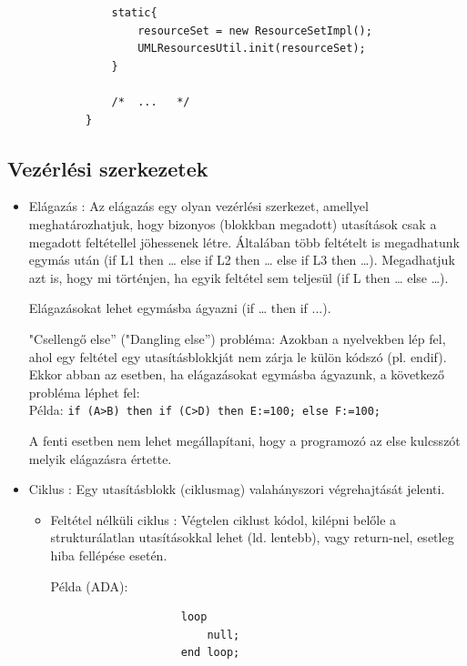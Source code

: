 \documentclass[margin=0px]{article}
\begin{document}
\begin{itemize}
\begin{itemize}
\begin{verbatim}
                static{
                    resourceSet = new ResourceSetImpl();
                    UMLResourcesUtil.init(resourceSet);
                }
                
                /*  ...   */
            }
            \end{verbatim}

          \end{itemize}

\end{itemize}

\subsection{Vezérlési szerkezetek}

\begin{itemize}
    \item	Elágazás : Az elágazás egy olyan vezérlési szerkezet, amellyel meghatározhatjuk, hogy bizonyos
          (blokkban megadott) utasítások csak a megadott feltétellel jöhessenek létre.
          Általában több feltételt is megadhatunk egymás után (if L1 then … else if L2 then … else if L3 then …).
          Megadhatjuk azt is, hogy mi történjen, ha egyik feltétel sem teljesül (if L then … else …).

          Elágazásokat lehet egymásba ágyazni (if … then if ...).

          "Csellengő else” ("Dangling else”) probléma: Azokban a nyelvekben lép fel, ahol egy feltétel egy
          utasításblokkját nem zárja le külön kódszó (pl. endif). Ekkor abban az esetben, ha elágazásokat
          egymásba ágyazunk, a következő probléma léphet fel:\\
          Példa: \texttt{if (A>B) then if (C>D) then E:=100; else F:=100;}

          A fenti esetben nem lehet megállapítani, hogy a programozó az else kulcsszót melyik elágazásra
          értette.

    \item	Ciklus : Egy utasításblokk (ciklusmag) valahányszori végrehajtását jelenti.
          \begin{itemize}
              \item	Feltétel nélküli ciklus : Végtelen ciklust kódol, kilépni belőle a strukturálatlan utasításokkal lehet
                    (ld. lentebb), vagy return-nel, esetleg hiba fellépése esetén.

                    Példa (ADA):
                    \begin{verbatim}
                    loop
                        null;
                    end loop;
                \end{verbatim}


\end{itemize}
\end{itemize}
\end{document}
